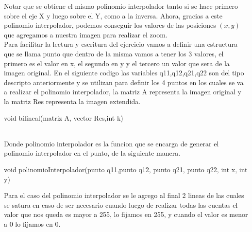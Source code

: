 Notar que se obtiene el mismo polinomio interpolador tanto si se hace primero sobre el eje X y luego sobre el Y, como a la inversa. Ahora, gracias a este polinomio interpolador, podemos conseguir los valores de las posiciones $(x,y)$ que agregamos a nuestra imagen para realizar el zoom.\\
Para facilitar la lectura y escritura del ejercicio vamos a definir una estructura que se llama punto que dentro de la misma vamos a tener los 3 valores, el primero es el valor en x, el segundo en y y el tercero un valor que sera de la imagen original. 
En el siguiente codigo las variables q11,q12,q21,q22 son del tipo descripto anteriormente y se utilizan para definir los 4 puntos en los cuales se va a realizar el polinomio interpolador, la matriz A representa la imagen original y la matriz Res representa la imagen extendida.
\begin{algorithm}
\begin{algorithmic}[1]\parskip=1mm
\caption{void bilineal(matriz A, vector Res,int k)}
\end{algorithmic}
\end{algorithm}\\
Donde polinomio interpolador es la funcion que se encarga de generar el polinomio interpolador en el punto, de la siguiente manera.
\newpage
\begin{algorithm}
\begin{algorithmic}[1]\parskip=1mm
\caption{void polinomioInterpolador(punto q11,punto q12, punto q21, punto q22, int x, int y)}
\end{algorithmic}
\end{algorithm}
Para el caso del polinomio interpolador se le agrego al final 2 lineas de las cuales se satura en caso de ser necesario cuando luego de realizar todas las cuentas el valor que nos queda es mayor a 255, lo fijamos en 255, y cuando el valor es menor a 0 lo fijamos en 0.
